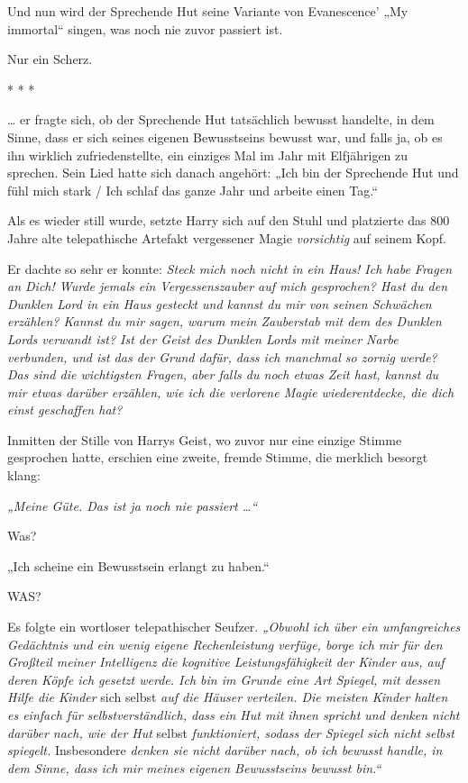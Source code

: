 

\hypertarget{selbstbewusstsein-teil-2}{%

Und nun wird der Sprechende Hut seine Variante von Evanescence' „My immortal“ singen, was noch nie zuvor passiert ist.

Nur ein Scherz.

* * *

… er fragte sich, ob der Sprechende Hut tatsächlich bewusst handelte, in dem Sinne, dass er sich seines eigenen Bewusstseins bewusst war, und falls ja, ob es ihn wirklich zufriedenstellte, ein einziges Mal im Jahr mit Elfjährigen zu sprechen. Sein Lied hatte sich danach angehört: „Ich bin der Sprechende Hut und fühl mich stark / Ich schlaf das ganze Jahr und arbeite einen Tag.“

Als es wieder still wurde, setzte Harry sich auf den Stuhl und platzierte das 800 Jahre alte telepathische Artefakt vergessener Magie \emph{vorsichtig} auf seinem Kopf.

Er dachte so sehr er konnte: \emph{Steck mich noch nicht in ein Haus! Ich habe Fragen an Dich! Wurde jemals ein Vergessenszauber auf mich gesprochen? Hast du den Dunklen Lord in ein Haus gesteckt und kannst du mir von seinen Schwächen erzählen? Kannst du mir sagen, warum mein Zauberstab mit dem des Dunklen Lords verwandt ist? Ist der Geist des Dunklen Lords mit meiner Narbe verbunden, und ist das der Grund dafür, dass ich manchmal so zornig werde? Das sind die wichtigsten Fragen, aber falls du noch etwas Zeit hast, kannst du mir etwas darüber erzählen, wie ich die verlorene Magie wiederentdecke, die dich einst geschaffen hat?}

Inmitten der Stille von Harrys Geist, wo zuvor nur eine einzige Stimme gesprochen hatte, erschien eine zweite, fremde Stimme, die merklich besorgt klang:

\emph{„Meine Güte. Das ist ja noch nie passiert …“}

Was?

„Ich scheine ein Bewusstsein erlangt zu haben.“

WAS?

Es folgte ein wortloser telepathischer Seufzer. \emph{„Obwohl ich über ein umfangreiches Gedächtnis und ein wenig eigene Rechenleistung verfüge, borge ich mir für den Großteil meiner Intelligenz die kognitive Leistungsfähigkeit der Kinder aus, auf deren Köpfe ich gesetzt werde. Ich bin im Grunde eine Art Spiegel, mit dessen Hilfe die Kinder} sich selbst \emph{auf die Häuser verteilen. Die meisten Kinder halten es einfach für selbstverständlich, dass ein Hut mit ihnen spricht und denken nicht darüber nach, wie der Hut} selbst \emph{funktioniert, sodass der Spiegel sich nicht selbst spiegelt.} Insbesondere \emph{denken sie nicht darüber nach, ob ich bewusst handle, in dem Sinne, dass ich mir meines eigenen Bewusstseins bewusst bin.“}

}
